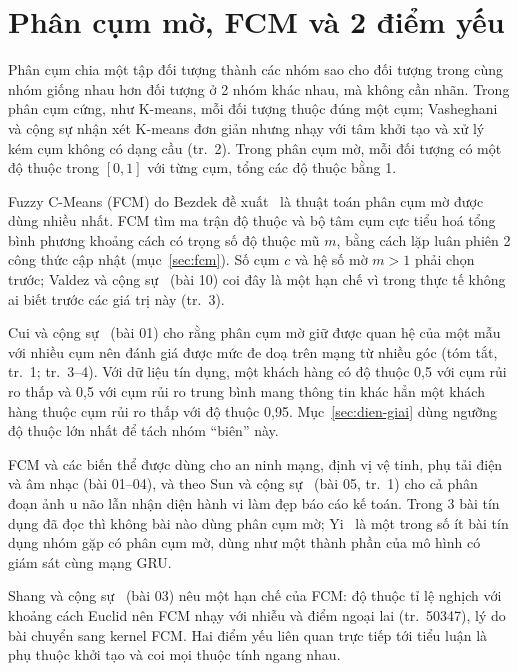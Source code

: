 \section{Phân cụm mờ, FCM và 2 điểm yếu}
\label{sec:phan-cum-mo}

Phân cụm chia một tập đối tượng thành các nhóm sao cho đối tượng trong cùng nhóm giống nhau hơn đối tượng ở 2 nhóm khác
nhau, mà không cần nhãn. Trong phân cụm cứng, như K-means, mỗi đối tượng thuộc đúng một cụm; Vasheghani và cộng sự nhận
xét K-means đơn giản nhưng nhạy với tâm khởi tạo và xử lý kém cụm không có dạng cầu (tr.~2). Trong phân cụm mờ, mỗi đối
tượng có một độ thuộc trong $[0, 1]$ với từng cụm, tổng các độ thuộc bằng 1.

Fuzzy C-Means (FCM) do Bezdek đề xuất~\cite{bezdek1981pattern,bezdek1984fcm} là thuật toán phân cụm mờ được dùng nhiều nhất.
FCM tìm ma trận độ thuộc và bộ tâm cụm cực tiểu hoá tổng bình phương khoảng cách có trọng số độ thuộc mũ $m$, bằng cách lặp
luân phiên 2 công thức cập nhật (mục~\ref{sec:fcm}). Số cụm $c$ và hệ số mờ $m > 1$ phải chọn trước; Valdez và cộng
sự~\cite{valdez2021bioinspired} (bài 10) coi đây là một hạn chế vì trong thực tế không ai biết trước các giá trị này (tr.~3).

Cui và cộng sự~\cite{cui2022fpsoueba} (bài 01) cho rằng phân cụm mờ giữ được quan hệ của
một mẫu với nhiều cụm nên đánh giá được mức đe doạ trên mạng từ nhiều góc (tóm tắt, tr.~1; tr.~3--4). Với dữ liệu tín dụng,
một khách hàng có độ thuộc 0,5 với cụm rủi ro thấp và 0,5 với cụm rủi ro trung bình mang thông tin khác hẳn một khách hàng
thuộc cụm rủi ro thấp với độ thuộc 0,95. Mục~\ref{sec:dien-giai} dùng ngưỡng độ thuộc lớn nhất để tách nhóm ``biên'' này.

FCM và các biến thể được dùng cho an ninh mạng, định vị vệ tinh, phụ tải điện và âm nhạc (bài 01--04), và theo Sun và cộng
sự~\cite{sun2024mstsofcm} (bài 05, tr.~1) cho cả phân đoạn ảnh u não lẫn nhận diện hành vi làm đẹp báo cáo kế toán. Trong
3 bài tín dụng đã đọc thì không bài nào dùng phân cụm mờ; Yi~\cite{yi2025gru} là một trong số ít bài tín dụng nhóm gặp có
phân cụm mờ, dùng như một thành phần của mô hình có giám sát cùng mạng GRU.

Shang và cộng sự~\cite{shang2021psokfcm} (bài 03) nêu một hạn chế của FCM: độ thuộc tỉ lệ nghịch với khoảng cách Euclid nên
FCM nhạy với nhiễu và điểm ngoại lai (tr.~50347), lý do bài chuyển sang kernel FCM. Hai điểm yếu liên quan trực tiếp tới
tiểu luận là phụ thuộc khởi tạo và coi mọi thuộc tính ngang nhau.

